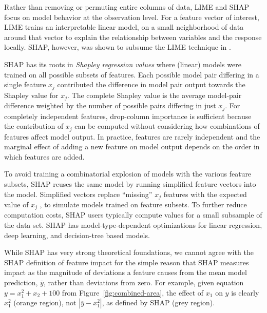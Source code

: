 \documentclass[11pt]{article}
\newcommand{\figref}[1]{Figure~\ref{#1}}
\newcommand{\todo}[1]{{{\color{red}{[#1]}}}}
\begin{document}
Rather than removing or permuting entire columns of data, LIME \citep{lime} and SHAP \citep{shap} focus on model behavior at the observation level. For a feature vector of interest, LIME trains an interpretable linear model, on a small neighborhood of data around that vector to explain the relationship between variables and the response locally. SHAP, however, was shown to subsume the LIME technique in \citep{shap}.

SHAP has its roots in {\em Shapley regression values} \citep{shapley-regression} where (linear) models were trained on all possible subsets of features.  Each possible model pair differing in a single feature $x_j$ contributed the difference in model pair output towards the Shapley value for $x_j$. The complete Shapley value is the average model-pair difference weighted by the number of possible pairs differing in just $x_j$.  For completely independent features, drop-column importance is sufficient because the contribution of $x_j$ can be computed without considering how combinations of features affect model output.  In practice, features are rarely independent and the marginal effect of adding a new feature on model output depends on the order in which features are added.  

To avoid training a combinatorial explosion of models with the various feature subsets, SHAP reuses the same model by running simplified feature vectors into the model. Simplified vectors replace ``missing'' $x_j$ features with the expected value of $x_j$ \todo{isn't it $E[f(z)]$? hold on, they are approximating $f(z_S)$ not missing $x_j$ features; another description indicates that you replace missing values with a random one selected from other records}, to simulate models trained on feature subsets. To further reduce computation costs, SHAP users typically compute values for a small subsample of the data set. SHAP has model-type-dependent optimizations for linear regression, deep learning, and decision-tree based models. 

While SHAP has very strong theoretical foundations, we cannot agree with the SHAP definition of feature impact for the simple reason that SHAP measures impact as the magnitude of deviations a feature causes from the mean model prediction, $\overline{y}$, rather than deviations from zero.   For example, given equation $y=x_1^2 + x_2 + 100$ from \figref{fig:combined-area}, the effect of $x_1$ on $y$ is clearly $x_1^2$ (orange region), not $|\overline{y} - x_1^2|$, as defined by SHAP (grey region).  \todo{need to explain why they are wrong or is it obvious?} 
\end{document}
